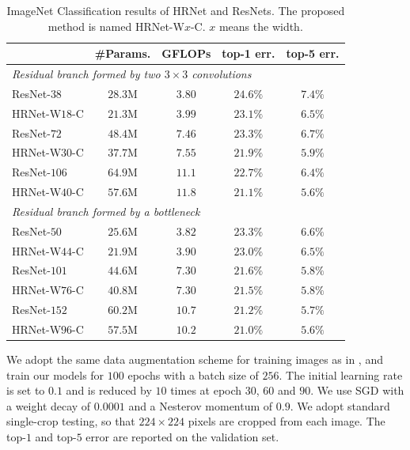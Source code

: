 \documentclass[10pt,journal,compsoc]{IEEEtran}
\begin{document}
	\begin{table}[ht]
	\setlength{\tabcolsep}{15pt}
	\scriptsize
	\centering
	\caption{ImageNet Classification results of HRNet and ResNets. The proposed method is named HRNet-W$x$-C. $x$ means the width.}
	\begin{tabular}{l|cc|cc}
		\hline
		& \#Params. & GFLOPs & top-1 err. & top-5 err. \\
		\hline
		
		\hline
		\multicolumn{5}{l}{\emph {Residual branch formed by two $3\times 3$ convolutions}}\\
		\hline
		ResNet-$38$ & $28.3$M & $3.80$ & $24.6\%$ & $7.4\%$ \\
		HRNet-W$18$-C& $21.3$M & $3.99$ & $\mathbf{23.1\%}$ & $\mathbf{6.5\%}$ \\
		\hline
		ResNet-$72$ & $48.4$M & $7.46$ & $23.3\%$ & $6.7\%$ \\
		HRNet-W$30$-C& $37.7$M & $7.55$ & $\mathbf{21.9\%}$ & $\mathbf{5.9\%}$ \\
		\hline
		ResNet-$106$& $64.9$M & $11.1$ & $22.7\%$ & $6.4\%$ \\	
		HRNet-W$40$-C& $57.6$M & $11.8$ & $\mathbf{21.1\%}$ & $\mathbf{5.6\%}$ \\
		\hline
		
		\hline
		\multicolumn{5}{l}{\emph {Residual branch formed by a bottleneck}}\\
		\hline
		ResNet-$50$& $25.6$M & $3.82$ & $23.3\%$ & $6.6\%$ \\
		HRNet-W$44$-C& $21.9$M & $3.90$ & $\mathbf{23.0\%}$ & $\mathbf{6.5\%}$ \\
		\hline
		ResNet-$101$& $44.6$M & $7.30$ & $21.6\%$ & $\mathbf{5.8\%}$ \\
		HRNet-W$76$-C& $40.8$M & $7.30$ & $\mathbf{21.5\%}$ & $\mathbf{5.8\%}$ \\
		\hline
		ResNet-$152$& $60.2$M & $10.7$ & $21.2\%$ & $5.7\%$ \\
		HRNet-W$96$-C& $57.5$M & $10.2$ & $\mathbf{21.0\%}$ & $\mathbf{5.6\%}$ \\
		\hline
	\end{tabular}
	\label{tab:ImageNetClassificationComparison}
	\end{table}


We adopt the same data augmentation scheme for training images as in \cite{HeZRS16}, 
and train our models for $100$ epochs with a batch size of $256$. 
The initial learning rate is set to $0.1$ 
and is reduced by $10$ times at epoch $30$, $60$ and $90$.
We use SGD with a weight decay of $0.0001$ and a Nesterov momentum of $0.9$. We adopt standard single-crop testing, so that $224\times 224$ pixels are cropped from each image. The top-$1$ 
and top-$5$ error are reported on the validation set.
\end{document}
